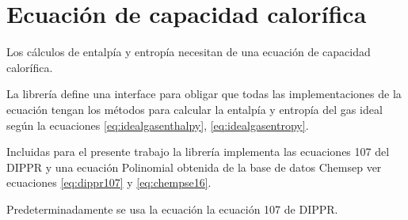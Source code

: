 \section{Ecuación de capacidad calorífica}\label{sec:cp}

	Los cálculos de entalpía y entropía necesitan de una ecuación de capacidad calorífica.

	La librería \Materia  define una interface para obligar que todas las implementaciones de la ecuación tengan los métodos para calcular la entalpía y entropía del gas ideal según la ecuaciones \ref{eq:idealgasenthalpy}, \ref{eq:idealgasentropy}.

	Incluidas para el presente trabajo la librería \Materia implementa las ecuaciones 107 del DIPPR y una ecuación Polinomial obtenida de la base de datos Chemsep ver ecuaciones \ref{eq:dippr107} y \ref{eq:chempse16}.
	
	Predeterminadamente se usa la ecuación la ecuación 107 de DIPPR.